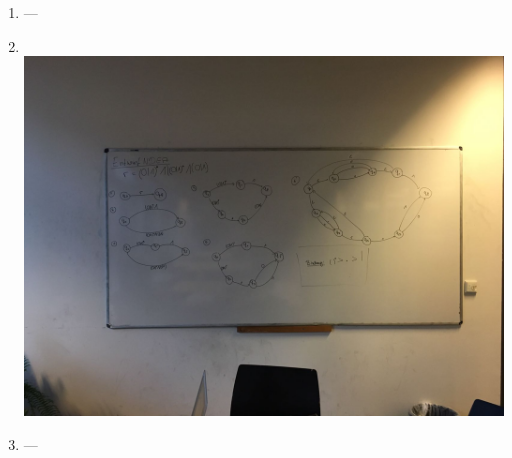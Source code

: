 \begin{enumerate}[1.]
  \item ---
  \item \ \\
    \includegraphics[width=\textwidth]{bilder/serie09_aufgabe2_1.jpg}
  \item ---
\end{enumerate}
